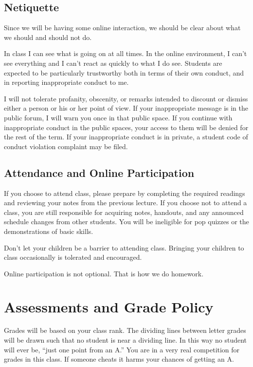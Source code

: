 \documentclass[letterpaper,10pt]{article}
\begin{document}
\subsection{Netiquette}
Since we will be having some online interaction, we should be clear
about what we should and should not do.

In class I can see what is going on at all times.  In the online
environment, I can't see everything and I can't react as quickly to
what I do see.  Students are expected to be particularly trustworthy
both in terms of their own conduct, and in reporting inappropriate
conduct to me.

I will not tolerate profanity, obscenity, or remarks intended to
discount or dismiss either a person or his or her point of view. If your inappropriate message is in the public forum, I will warn you
once in that public space. If you continue with inappropriate conduct
in the public spaces, your access to them will be denied for the rest
of the term. If your inappropriate
conduct is in private, a student code of conduct violation complaint
may be filed.

 \subsection{Attendance and Online Participation}
 
 If you choose to attend class, please prepare by
 completing the required readings and reviewing your notes from the
 previous lecture. If you choose not to attend a class, you are still
 responsible for acquiring notes, handouts, and any announced schedule
 changes from other students.  You will be ineligible for pop quizzes
 or the demonstrations of basic skills.
 
 Don't let your children be a barrier to attending class. Bringing your
 children to class occasionally is tolerated and encouraged.
 
 Online participation is not optional.  That is how we do homework.

\section{Assessments and Grade Policy}


Grades will be based on your class rank.  The dividing lines between letter grades will be
drawn such that no student is near a dividing line. In this way no
student will ever be, ``just one point from an A.'' You are in a very
real competition for grades in this class. If someone cheats it harms
your chances of getting an A. 
\end{document}
